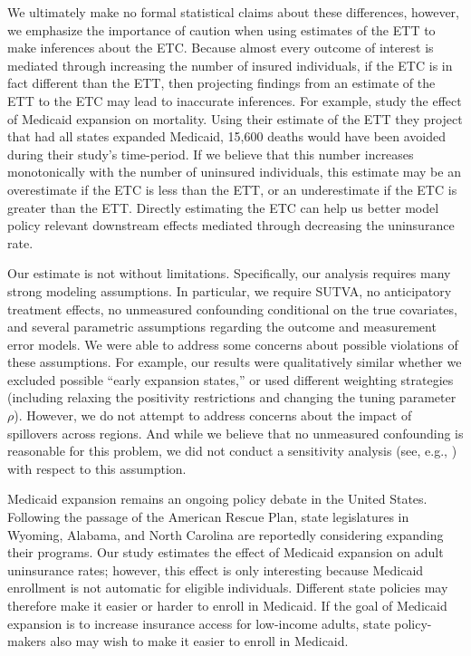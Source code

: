 \documentclass[aoas]{imsart}
\theoremstyle{plain}
\theoremstyle{remark}
\begin{document}
We ultimately make no formal statistical claims about these differences, however, we emphasize the importance of caution when using estimates of the ETT to make inferences about the ETC. Because almost every outcome of interest is mediated through increasing the number of insured individuals, if the ETC is in fact different than the ETT, then projecting findings from an estimate of the ETT to the ETC may lead to inaccurate inferences. For example, \cite{miller2019medicaid} study the effect of Medicaid expansion on mortality. Using their estimate of the ETT they project that had all states expanded Medicaid, 15,600 deaths would have been avoided during their study's time-period. If we believe that this number increases monotonically with the number of uninsured individuals, this estimate may be an overestimate if the ETC is less than the ETT, or an underestimate if the ETC is greater than the ETT. Directly estimating the ETC can help us better model policy relevant downstream effects mediated through decreasing the uninsurance rate. 

Our estimate is not without limitations. Specifically, our analysis requires many strong modeling assumptions. In particular, we require SUTVA, no anticipatory treatment effects, no unmeasured confounding conditional on the true covariates, and several parametric assumptions regarding the outcome and measurement error models. We were able to address some concerns about possible violations of these assumptions. For example, our results were qualitatively similar whether we excluded possible ``early expansion states,'' or used different weighting strategies (including relaxing the positivity restrictions and changing the tuning parameter $\rho$). However, we do not attempt to address concerns about the impact of spillovers across regions. And while we believe that no unmeasured confounding is reasonable for this problem, we did not conduct a sensitivity analysis (see, e.g., \cite{bonvini2021sensitivity}) with respect to this assumption. 

Medicaid expansion remains an ongoing policy debate in the United States. Following the passage of the American Rescue Plan, state legislatures in Wyoming, Alabama, and North Carolina are reportedly considering expanding their programs. Our study estimates the effect of Medicaid expansion on adult uninsurance rates; however, this effect is only interesting because Medicaid enrollment is not automatic for eligible individuals. Different state policies may therefore make it easier or harder to enroll in Medicaid. If the goal of Medicaid expansion is to increase insurance access for low-income adults, state policy-makers also may wish to make it easier to enroll in Medicaid. 
\end{document}
